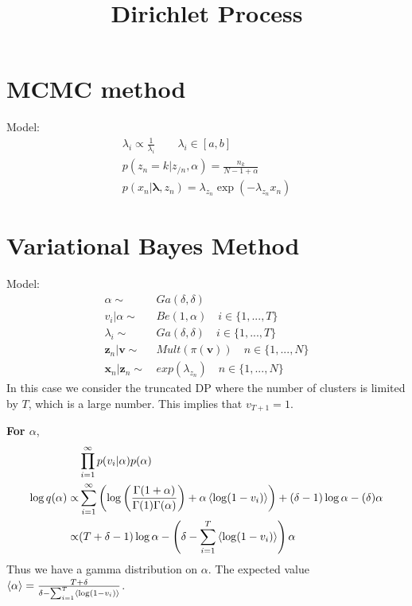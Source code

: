 \documentclass{article}
\title{Dirichlet Process}
\date{}
\begin{document}
\maketitle

\section{MCMC method}
Model:
\begin{align}
\lambda_i\propto\frac{1}{\lambda_i}\qquad \lambda_i\in[a,b]\\
p(z_n=k|z_{/n},\alpha)=\frac{n_k}{N-1+\alpha}\\
p(x_n|\mathbf{\lambda},z_n)=\lambda_{z_n}\exp(-\lambda_{z_n}x_n)
\end{align}

\section{Variational Bayes Method}
Model:
\begin{align}
\alpha \sim & \, Ga(\delta,\delta)
\label{eq:alpha}\\
v_i|\alpha \sim & \, Be(1,\alpha)\quad i\in\{1,...,T\}
\label{eq:v}\\
\lambda_i\sim & \, Ga(\delta,\delta)\quad i\in\{1,...,T\}\\
\mathbf{z}_n|\mathbf{v}\sim & \, Mult(\pi(\mathbf{v})) \quad n\in\{1,...,N\} \\
\mathbf{x}_n|\mathbf{z}_n\sim & \, exp(\lambda_{z_n}) \quad n\in\{1,...,N\}
\label{eq:gen}
\end{align}
In this case we consider the truncated DP where the number of clusters is limited by $T$, which is a large number. This implies that $v_{T+1}=1$.

\textbf{For $\alpha$},
\begin{align}
\nonumber&\prod_{i=1}^{\infty}p(v_i|\alpha)p(\alpha)\\
\nonumber\log q(\alpha)\propto &  \sum_{i=1}^{\infty}\left( \log\left(\frac{\Gamma(1+\alpha)}{\Gamma(1)\Gamma(\alpha)}\right)+\alpha\left\langle\log (1-v_i)\right\rangle\right)+(\delta-1)\log \alpha -(\delta)\alpha\\
\propto & (T+\delta-1)\log \alpha-\left(\delta-\sum_{i=1}^{T} \left\langle\log (1-v_i)\right\rangle\right) \alpha
\end{align}
Thus we have a gamma distribution on $\alpha$. The expected value $\left\langle\alpha\right\rangle=\frac{T+\delta}{\delta-\sum_{i=1}^{T} \left\langle\log (1-v_i)\right\rangle}$.
\end{document}
